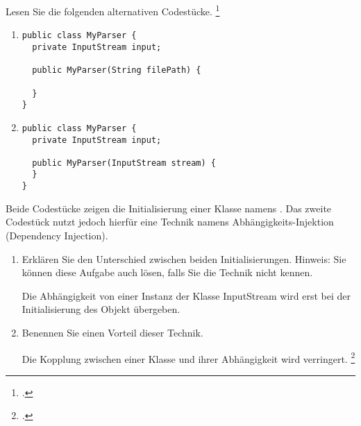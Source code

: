 \documentclass{lehramt-informatik-aufgabe}
\begin{document}

\let\j=\liJavaCode

Lesen Sie die folgenden alternativen Codestücke.
\footcite{examen:66116:2021:03}

\begin{enumerate}
\item

\begin{verbatim}
public class MyParser {
  private InputStream input;

  public MyParser(String filePath) {

  }
}
\end{verbatim}

\item

\begin{verbatim}
public class MyParser {
  private InputStream input;

  public MyParser(InputStream stream) {
  }
}
\end{verbatim}

\end{enumerate}
Beide Codestücke zeigen die Initialisierung einer Klasse namens
\j{MyParser}. Das zweite Codestück nutzt jedoch hierfür eine Technik
namens Abhängigkeits-Injektion (Dependency Injection).

\begin{enumerate}


\item Erklären Sie den Unterschied zwischen beiden Initialisierungen.
Hinweis: Sie können diese Aufgabe auch lösen, falls Sie die Technik
nicht kennen.

\begin{liAntwort}
Die Abhängigkeit von einer Instanz der Klasse InputStream wird erst bei
der Initialisierung des Objekt übergeben.
\end{liAntwort}


\item Benennen Sie einen Vorteil dieser Technik.

\begin{liAntwort}
Die Kopplung zwischen einer Klasse und ihrer Abhängigkeit wird verringert.
\footcite{wiki:dependency-injection}
\end{liAntwort}

\end{enumerate}
\end{document}
